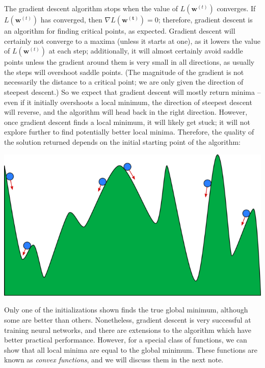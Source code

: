 \documentclass{article}
\begin{document}
The gradient descent algorithm stops when the value of $L(\mathbf{w}^{(t)})$ converges. If $L(\mathbf{w}^{(t)})$ has converged, then $\nabla L(\mathbf{w^{(t)}}) = 0$; therefore, gradient descent is an algorithm for finding critical points, as expected. Gradient descent will certainly not converge to a maxima (unless it starts at one), as it lowers the value of $L(\mathbf{w}^{(t)})$ at each step; additionally, it will almost certainly avoid saddle points unless the gradient around them is very small in all directions, as usually the steps will overshoot saddle points. (The magnitude of the gradient is not necessarily the distance to a critical point; we are only given the direction of steepest descent.) So we expect that gradient descent will mostly return minima -- even if it initially overshoots a local minimum, the direction of steepest descent will reverse, and the algorithm will head back in the right direction. However, once gradient descent finds a local minimum, it will likely get stuck; it will not explore further to find potentially better local minima. Therefore, the quality of the solution returned depends on the initial starting point of the algorithm:

\begin{center}
    \includegraphics[width=.6\textwidth]{figures/fig1.png}
\end{center}

\noindent Only one of the initializations shown finds the true global minimum, although some are better than others. Nonetheless, gradient descent is very successful at training neural networks, and there are extensions to the algorithm which have better practical performance. However, for a special class of functions, we can show that all local minima are equal to the global minimum. These functions are known as \textit{convex functions}, and we will discuss them in the next note.
\end{document}
